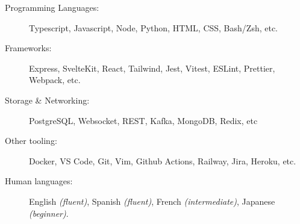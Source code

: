 \documentclass[10pt]{CurriculumVitae}
\begin{document}
    \begin{description}
      \item[Programming Languages:] Typescript, Javascript, Node, Python, HTML, CSS, Bash/Zsh, etc.
      \item[Frameworks:] Express, SvelteKit, React, Tailwind, Jest, Vitest, ESLint, Prettier, Webpack, etc.
      \item[Storage \& Networking:] PostgreSQL, Websocket, REST, Kafka, MongoDB, Redix, etc
      \item[Other tooling:] Docker, VS Code, Git, Vim, Github Actions, Railway, Jira, Heroku, etc.
      \item[Human languages:] English \emph{(fluent)}, Spanish \emph{(fluent)}, French \emph{(intermediate)}, Japanese \emph{(beginner)}.
    \end{description}


     


\end{document}
